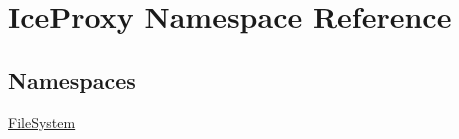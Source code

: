 \hypertarget{namespace_ice_proxy}{}\section{Ice\+Proxy Namespace Reference}
\label{namespace_ice_proxy}
\subsection*{Namespaces}
\begin{DoxyCompactItemize}
\item 
 \hyperlink{namespace_ice_proxy_1_1_file_system}{File\+System}
\end{DoxyCompactItemize}

